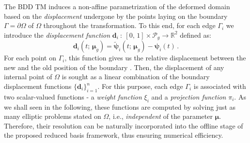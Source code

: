 \documentclass[12pt, a4paper, twoside, openright]{report}
\numberwithin{equation}{chapter}
\theoremstyle{theorem}
\theoremstyle{definition}
\theoremstyle{remark}
\theoremstyle{proposition}
\numberwithin{figure}{chapter}
\newcommand{\wt}[1]{\widetilde{#1}}
\newcommand{\bg}[1]{\boldsymbol{#1}}
\begin{document}
		The BDD TM induces a non-affine parametrization of the deformed domain based on the \emph{displacement} undergone by the points laying on the boundary $\Gamma = \partial \Omega$ of $\Omega$ throughout the transformation. To this end, for each edge $\Gamma_i$ we introduce the \emph{displacement function} $\bg{d}_i ~ : ~ [0, \, 1] \times \mathcal{P}_g \rightarrow \mathbb{R}^2$ defined as:
		\begin{equation}
			\bg{d}_i(t; \, \bg{\mu}_g) = \wt{\bg{\psi}}_i(t; \, \bg{\mu}_g) - \bg{\psi}_i(t) \, .
		\end{equation}
		For each point on $\Gamma_i$, this function gives us the relative displacement between the new and the old position of the boundary \cite{JIR14}. Then, the displacement of any internal point of $\Omega$ is sought as a linear combination of the boundary displacement functions $\big\lbrace \bg{d}_i \big\rbrace_{i = 1}^n$. For this purpose, each edge $\Gamma_i$ is associated with two scalar-valued functions - a \emph{weight function} $\xi_i$ and a \emph{projection function} $\pi_i$. As we shall seen in the following, these functions are computed by solving just as many elliptic problems stated on $\Omega$, i.e., \emph{independent} of the parameter $\bg{\mu}$. Therefore, their resolution can be naturally incorporated into the offline stage of the proposed reduced basis framework, thus ensuring numerical efficiency. 
		
\end{document}
